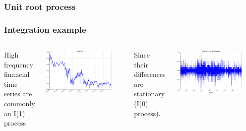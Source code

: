 \documentclass{beamer}
\begin{document}
\begin{frame}
\frametitle{Unit root process}

\end{frame}


\begin{frame}
\frametitle{Integration example}
\begin{columns}
\column[t]{5cm}
High frequency financial time series are commonly an I(1) process 
\begin{center}
\includegraphics[width=0.85\textwidth]{img/EURUSD}
\end{center}
\column[t]{5cm}
Since their differences are stationary (I(0) process).
\newline
\begin{center}
\includegraphics[width=0.85\textwidth]{img/DEURUSD}
\end{center}
\end{columns}
\end{frame}
\end{document}
